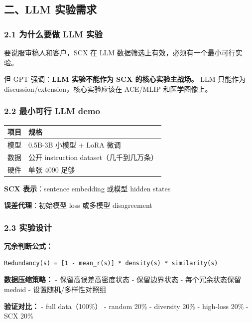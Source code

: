 \documentclass[
  12pt,
]{ctexart}
\begin{document}
\subsection{二、LLM 实验需求}\label{ux4e8cllm-ux5b9eux9a8cux9700ux6c42}

\subsubsection{2.1 为什么要做 LLM
实验}\label{ux4e3aux4ec0ux4e48ux8981ux505a-llm-ux5b9eux9a8c}

要说服审稿人和客户，SCX 在 LLM 数据筛选上有效，必须有一个最小可行实验。

但 GPT 强调：\textbf{LLM 实验不能作为 SCX 的核心实验主战场。} LLM
只能作为 discussion/extension，核心实验应该在 ACE/MLIP 和医学图像上。

\subsubsection{2.2 最小可行 LLM
demo}\label{ux6700ux5c0fux53efux884c-llm-demo}

\begin{longtable}[]{@{}ll@{}}
\toprule\noalign{}
项目 & 规格 \\
\midrule\noalign{}
\endhead
\bottomrule\noalign{}
\endlastfoot
模型 & 0.5B-3B 小模型 + LoRA 微调 \\
数据 & 公开 instruction dataset（几千到几万条） \\
硬件 & 单张 4090 足够 \\
\end{longtable}

\textbf{SCX 表示}：sentence embedding 或模型 hidden states

\textbf{误差代理}：初始模型 loss 或多模型 disagreement

\subsubsection{2.3 实验设计}\label{ux5b9eux9a8cux8bbeux8ba1}

\textbf{冗余判断公式：}

\begin{verbatim}
Redundancy(s) = [1 - mean_r(s)] * density(s) * similarity(s)
\end{verbatim}

\textbf{数据压缩策略：} - 保留高误差高密度状态 - 保留边界状态 -
每个冗余状态保留 medoid - 设置随机/多样性对照组

\textbf{验证对比：} - full data（100\%） - random 20\% - diversity 20\%
- high-loss 20\% - SCX 20\%
\end{document}
